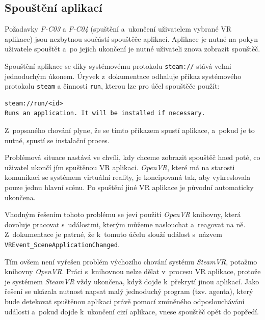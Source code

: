 \subsection{Spouštění
aplikací}\label{spouux161tux11bnuxed-aplikacuxed}

Požadavky \emph{F-C03} a \emph{F-C04} (spuštění a~ukončení uživatelem
vybrané VR aplikace) jsou nezbytnou součástí spouštěče
aplikací. Aplikace je nutné na pokyn uživatele spouštět a~po jejich ukončení 
je nutné uživateli znova zobrazit spouštěč.

Spouštění aplikace se díky systémovému protokolu \texttt{steam://} stává
velmi jednoduchým úkonem. Úryvek z~dokumentace \autocite{protocoldocs} odhaluje příkaz
systémového protokolu \texttt{steam} a činnosti \texttt{run}, kterou lze
pro účel spouštěče použít:

\begin{verbatim}
steam://run/<id>
Runs an application. It will be installed if necessary.
\end{verbatim}

Z~popsaného chování plyne, že se tímto příkazem spustí aplikace, a~pokud je
to nutné, spustí se instalační proces. 

Problémová situace nastává ve
chvíli, kdy chceme zobrazit spouštěč hned poté, co uživatel
ukončí jím spuštěnou VR aplikaci. \emph{OpenVR}, které má na starosti
komunikaci se systémem virtuální reality, je koncipovaná tak, 
aby vykreslovala pouze jednu hlavní scénu. Po spuštění jiné VR aplikace 
je původní automaticky ukončena.

Vhodným řešením tohoto problému se jeví použití \emph{OpenVR} knihovny, která
dovoluje pracovat s~událostmi, kterým můžeme naslouchat a~reagovat na
ně. Z~dokumentace \autocite{openvrdocs} je patrné, že k~tomuto účelu slouží událost s~názvem
\texttt{VREvent\_SceneApplicationChanged}. 

Tím ovšem není vyřešen
problém výchozího chování systému \emph{SteamVR}, potažmo knihovny
\emph{OpenVR}. Práci s~knihovnou nelze dělat v~procesu VR aplikace,
protože je systémem \emph{SteamVR} vždy ukončena, když dojde
k~překrytí jinou aplikací. Jako řešení se ukázala nutnost napsat malý 
jednoduchý program (tzv. agenta), který bude detekovat spuštěnou aplikaci právě
pomocí zmíněného odposlouchávání události a~pokud dojde k~ukončení cizí 
aplikace, vnese spouštěč opět do popředí.

